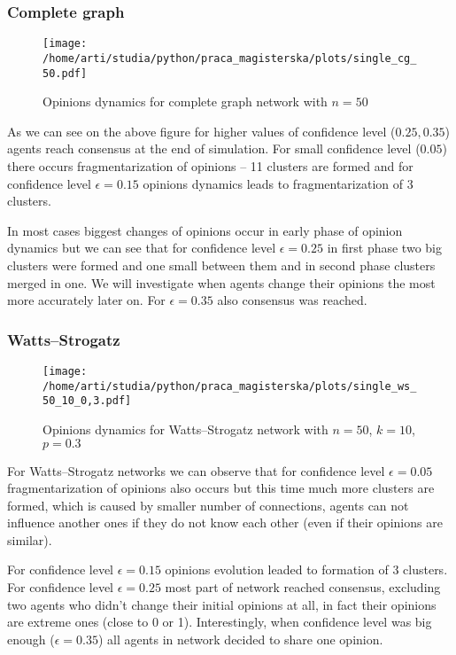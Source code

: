 \documentclass{article}
\begin{document}
\subsubsection{Complete graph}

\begin{figure}[H]
		\centering
		\texttt{[image: /home/arti/studia/python/praca\_magisterska/plots/single\_cg\_50.pdf]}
		\caption{Opinions dynamics for complete graph network with $n=50$}
\end{figure}
As we can see on the above figure for higher values of confidence level ($0.25, 0.35$) agents reach consensus at the end of simulation. For small confidence level ($0.05$) there occurs fragmentarization of opinions -- 11 clusters are formed and for confidence level $\epsilon=0.15$ opinions dynamics leads to fragmentarization of 3 clusters.
\indent

In most cases biggest changes of opinions occur in early phase of opinion dynamics but we can see that for confidence level $\epsilon=0.25$ in first phase two big clusters were formed and one small between them and in second phase clusters merged in one. We will investigate when agents change their opinions the most more accurately later on. For $\epsilon=0.35$ also consensus was reached.

\subsubsection{Watts--Strogatz}

\begin{figure}[H]
		\centering
		\texttt{[image: /home/arti/studia/python/praca\_magisterska/plots/single\_ws\_50\_10\_0,3.pdf]}
		\caption{Opinions dynamics for Watts--Strogatz network with $n=50$, $k=10$, $p=0.3$}
\end{figure}
For Watts--Strogatz networks we can observe that for confidence level $\epsilon=0.05$ fragmentarization of opinions also occurs but this time much more clusters are formed, which is caused by smaller number of connections, agents can not influence another ones if they do not know each other (even if their opinions are similar). 
\indent

For confidence level $\epsilon=0.15$ opinions evolution leaded to formation of 3 clusters. For confidence level $\epsilon=0.25$ most part of network reached consensus, excluding two agents who didn't change their initial opinions at all, in fact their opinions are extreme ones (close to 0 or 1). Interestingly, when confidence level was big enough ($\epsilon=0.35$) all agents in network decided to share one opinion.
\indent
\end{document}
